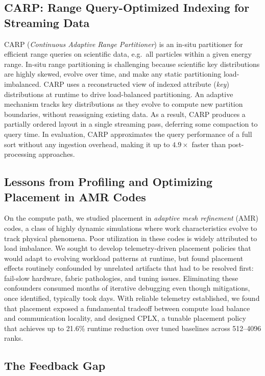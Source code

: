 \subsection{CARP: Range Query-Optimized Indexing for Streaming Data}

CARP (\emph{Continuous Adaptive Range Partitioner}) is an in-situ partitioner for efficient range
queries on scientific data, e.g.\ all particles within a given energy range.
In-situ range partitioning is challenging because scientific key distributions are highly skewed,
evolve over time, and make any static partitioning load-imbalanced.
CARP uses a reconstructed view of indexed attribute (\emph{key}) distributions at runtime to drive
load-balanced partitioning.
An adaptive mechanism tracks key distributions as they evolve to compute new partition boundaries,
without reassigning existing data.
As a result, CARP produces a partially ordered layout in a single streaming pass, deferring some
compaction to query time.
In evaluation, CARP approximates the query performance of a full sort without any ingestion
overhead, making it up to $4.9\times$ faster than post-processing approaches.

\subsection{Lessons from Profiling and Optimizing Placement in AMR Codes}

On the compute path, we studied placement in \emph{adaptive mesh refinement} (AMR) codes, a class
of highly dynamic simulations where work characteristics evolve to track physical phenomena.
Poor utilization in these codes is widely attributed to load imbalance.
We sought to develop telemetry-driven placement policies that would adapt to evolving workload
patterns at runtime, but found placement effects routinely confounded by unrelated
artifacts that had to be resolved first: fail-slow hardware, fabric pathologies, and tuning issues.
Eliminating these confounders consumed months of iterative debugging even though mitigations, once
identified, typically took days.
With reliable telemetry established, we found that placement exposed a fundamental tradeoff between
compute load balance and communication locality, and designed CPLX, a tunable placement policy that
achieves up to 21.6\% runtime reduction over tuned baselines across 512--4096 ranks.

\subsection{The Feedback Gap}

